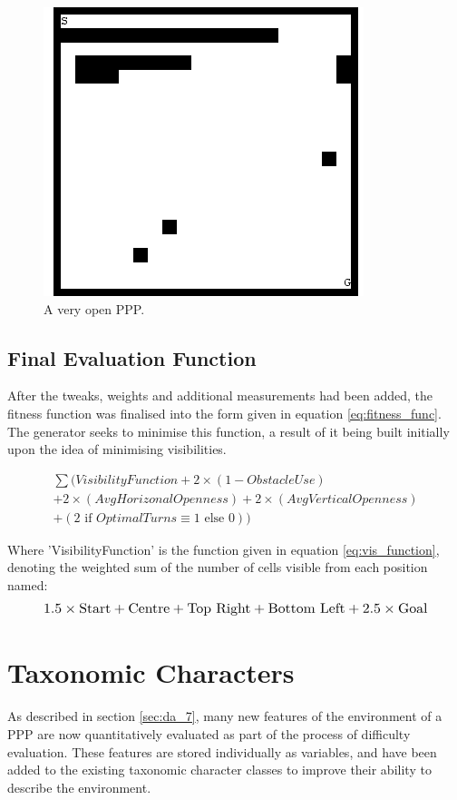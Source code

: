 \documentclass[authoryearcitations]{UoYCSproject}
\begin{document}
\begin{figure}
\graphicspath{ {DesignImpPics/} }
\includegraphics[scale=0.65]{wide_plain.png}
\caption{ A very open PPP.}
\label{fig:open_ppp}
\end{figure}

\subsection{Final Evaluation Function}
\label{sec:function}
After the tweaks, weights and additional measurements had been added, the fitness function was finalised into the form given in equation \ref{eq:fitness_func}. The generator seeks to minimise this function, a result of it being built initially upon the idea of minimising visibilities.

\begin{multline}
\sum(VisibilityFunction + 2\times(1-ObstacleUse)\\ + 2\times(AvgHorizonalOpenness) + 2\times(AvgVerticalOpenness)\\+ (2 \text{ if } OptimalTurns \equiv 1 \text{ else } 0))
\label{eq:fitness_func}
\end{multline}

Where 'VisibilityFunction' is the function given in equation  \ref{eq:vis_function}, denoting the weighted sum of the number of cells visible from each position named:
\begin{equation}
\resizebox{0.9\textwidth}{!}{$
1.5 \times \text{Start}+\text{Centre}+\text{Top Right}+\text{Bottom Left}+2.5 \times \text{Goal}
$}
\label{eq:vis_function}
\end{equation}

\section{Taxonomic Characters}
\label{sec:taxchar_design}
As described in section \ref{sec:da_7}, many new features of the environment of a PPP are now quantitatively evaluated as part of the process of difficulty evaluation. These features are stored individually as variables, and have been added to the existing taxonomic character classes to improve their ability to describe the environment.
\end{document}
